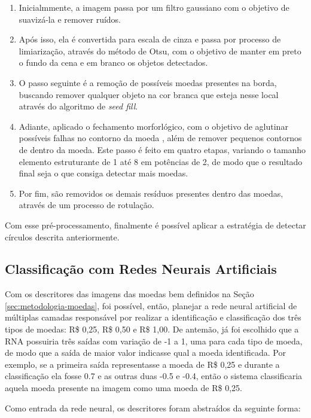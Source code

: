 \documentclass[10pt,journal,compsoc]{IEEEtran}
\begin{document}
\begin{enumerate}

\item Inicialmmente, a imagem passa por um filtro gaussiano com o objetivo de suavizá-la e remover ruídos.
\item Após isso, ela é convertida para escala de cinza e passa por processo de limiarização, através do método de Otsu, com o objetivo de manter em preto o fundo da cena e em branco os objetos detectados.
\item O passo seguinte é a remoção de possíveis moedas presentes na borda, buscando remover qualquer objeto na cor branca que esteja nesse local através do algoritmo de \textit{seed fill}.
\item Adiante, aplicado o fechamento morforlógico, com o objetivo de aglutinar possíveis falhas no contorno da moeda , além de remover pequenos contornos de dentro da moeda. Este passo é feito em quatro etapas, variando o tamanho elemento estruturante de 1 até 8 em potências de 2, de modo que o resultado final seja o que consiga detectar mais moedas.
\item Por fim, são removidos os demais resíduos presentes dentro das moedas, através de um processo de rotulação. 
\end{enumerate}

Com esse pré-processamento, finalmente é possível aplicar a estratégia de detectar círculos descrita anteriormente.

\subsection{Classificação com Redes Neurais Artificiais}
\label{sec:metodologia-rna}


Com os descritores das imagens das moedas bem definidos na Seção \ref{sec:metodologia-moedas}, foi possível, então, planejar a rede neural artificial de múltiplas camadas responsável por realizar a identificação e classificação dos três tipos de moedas: R\$ 0,25, R\$ 0,50 e R\$ 1,00. De antemão, já foi escolhido que a RNA possuiria três saídas com variação de -1 a 1, uma para cada tipo de moeda, de modo que a saída de maior valor indicasse qual a moeda identificada. Por exemplo, se a primeira saída representasse a moeda de R\$ 0,25 e durante a classificação ela fosse 0.7 e as outras duas -0.5 e -0.4, então o sistema classificaria aquela moeda presente na imagem como uma moeda de R\$ 0,25.

Como entrada da rede neural, os descritores foram abstraídos da seguinte forma:
\end{document}
